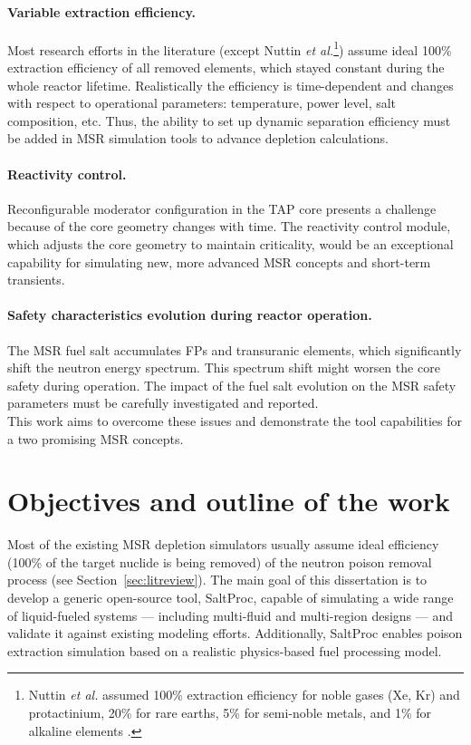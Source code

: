 \paragraph*{Variable extraction efficiency.} Most research efforts in 
the literature (except Nuttin \emph{et al.}\footnote{Nuttin \emph{et al.} 
assumed 100\% extraction efficiency for noble gases (Xe, Kr) and protactinium, 
20\% for rare earths, 5\% for semi-noble metals, and 1\% for alkaline 
elements \cite{nuttin_potential_2005}.}) assume ideal 100\% extraction 
efficiency of all removed 
elements, which stayed constant during the whole reactor lifetime. 
Realistically the efficiency is time-dependent and changes with respect to 
operational parameters: temperature, power level, salt composition, etc. Thus, 
the ability to set up dynamic separation efficiency must be added in \gls{MSR} 
simulation tools to advance depletion calculations.
\paragraph*{Reactivity control.} Reconfigurable moderator configuration in the 
\gls{TAP} core presents a challenge because of the core geometry changes with 
time. The reactivity control module, which adjusts the core geometry 
to maintain criticality, would be an exceptional capability for simulating  
new, more advanced \gls{MSR} concepts and short-term transients.
\paragraph*{Safety characteristics evolution during reactor operation.} The 
\gls{MSR} fuel salt  accumulates \glspl{FP} and transuranic elements, which 
significantly shift the neutron energy spectrum. This spectrum shift might 
worsen the core safety during operation. The impact of the fuel salt 
evolution on the \gls{MSR} safety parameters must be carefully investigated 
and reported.\\

This work aims to overcome these issues and demonstrate the tool capabilities 
for a two promising \gls{MSR} concepts.


\section{Objectives and outline of the work}
Most of the existing \gls{MSR} depletion simulators usually assume ideal  
efficiency (100\% of the target nuclide is being removed) of the neutron 
poison removal process (see Section~\ref{sec:litreview}). The main goal of 
this dissertation is to develop a generic open-source tool, SaltProc, capable 
of simulating a wide range of liquid-fueled systems --- including multi-fluid 
and multi-region designs --- and validate it against existing modeling 
efforts. Additionally, SaltProc enables poison extraction simulation based on 
a realistic physics-based fuel processing model. 

